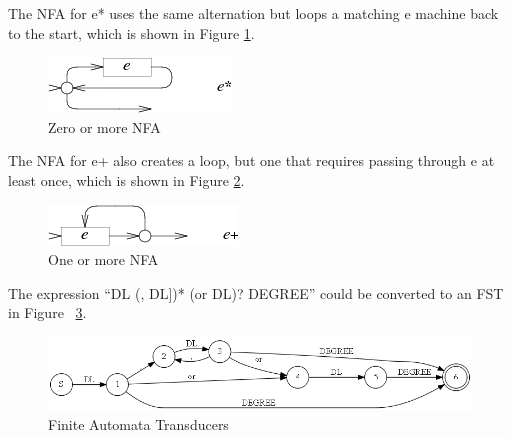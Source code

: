 The NFA for e* uses the same alternation but loops a matching e machine back to the start, which is shown in Figure \ref{fig:nfa_star}.

\begin{figure}[htbp]
  \centering
  \includegraphics[scale=1]{images/star.png}
  \caption{Zero or more NFA}
  \label{fig:nfa_star}
\end{figure}

The NFA for e+ also creates a loop, but one that requires passing through e at least once, which is shown in Figure \ref{fig:nfa_plus}.

\begin{figure}[htbp]
  \centering
  \includegraphics[scale=1]{images/plus.png}
  \caption{One or more NFA}
  \label{fig:nfa_plus}
\end{figure}

The expression ``DL (, DL])*  (or DL)? DEGREE'' could be converted to an FST in Figure ~\ref{fig:fst}.

\begin{figure}[htbp]
  \centering
  \includegraphics[scale=0.6]{images/test_tokenre2_6.png}
  \caption{Finite Automata Transducers}
  \label{fig:fst}
\end{figure}


